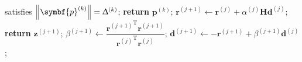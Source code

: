 \begin{algorithm}
\begin{algorithmic}[1]
                        satisfies
                        $\left \lVert \symbf{p}^{(k)} \right \rVert = \trustradius{k}$;
                    \State \textbf{return} $\symbf{p}^{(k)}$;
                \EndIf
                \State $\symbf{r}^{(j+1)} \gets
                    \symbf{r}^{(j)} +
                    \alpha^{(j)}
                    \symbf{H}
                    \symbf{d}^{(j)}$;
                    \State \textbf{return} $\symbf{z}^{(j+1)}$;
                \EndIf
                \State $\beta^{(j+1)} \gets
                    \dfrac{{\symbf{r}^{(j+1)}}^{\mathrm{T}} \symbf{r}^{(j+1)}}{{\symbf{r}^{(j)}}^{\mathrm{T}} \symbf{r}^{(j)}}$;
                \State $\symbf{d}^{(j+1)} \gets -\symbf{r}^{(j+1)} + \beta^{(j+1)} \symbf{d}^{(j)}$;
            \EndFor
        \EndProcedure
    \end{algorithmic}
\end{algorithm}



